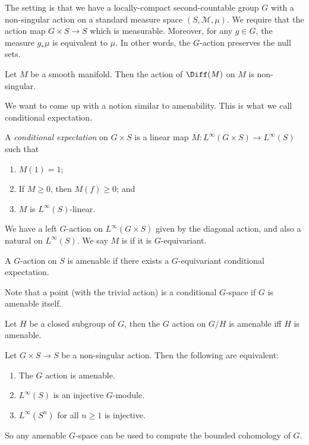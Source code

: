 \documentclass[a4paper]{article}
\begin{document}
The setting is that we have a locally-compact second-countable group $G$ with a non-singular action on a standard measure space $(S, \mathcal{M}, \mu)$. We require that the action map $G \times S \to S$ which is measurable. Moreover, for any $g \in G$, the measure $g_* \mu$ is equivalent to $\mu$. In other words, the $G$-action preserves the null sets.

\begin{eg}
  Let $M$ be a smooth manifold. Then the action of $\Diff(M)$ on $M$ is non-singular.
\end{eg}

We want to come up with a notion similar to amenability. This is what we call conditional expectation.
\begin{defi}
  A \emph{conditional expectation} on $G \times S$ is a linear map $M\colon L^\infty(G \times S) \to L^\infty(S)$ such that
  \begin{enumerate}
    \item $M(1) = 1$;
    \item If $M \geq 0$, then $M(f) \geq 0$; and
    \item $M$ is $L^\infty(S)$-linear.
  \end{enumerate}
\end{defi}
We have a left $G$-action on $L^\infty(G \times S)$ given by the diagonal action, and also a natural on $L^\infty(S)$. We say $M$ is  if it is $G$-equivariant.

\begin{defi}
  A $G$-action on $S$ is amenable if there exists a $G$-equivariant conditional expectation.
\end{defi}
Note that a point (with the trivial action) is a conditional $G$-space if $G$ is amenable itself.

\begin{eg}
  Let $H$ be a closed subgroup of $G$, then the $G$ action on $G/H$ is amenable iff $H$ is amenable.
\end{eg}

\begin{thm}
  Let $G \times S \to S$ be a non-singular action. Then the following are equivalent:
  \begin{enumerate}
    \item The $G$ action is amenable.
    \item $L^\infty(S)$ is an injective $G$-module.
    \item $L^\infty(S^n)$ for all $n \geq 1$ is injective.
  \end{enumerate}
\end{thm}
So any amenable $G$-space can be used to compute the bounded cohomology of $G$.
\end{document}
